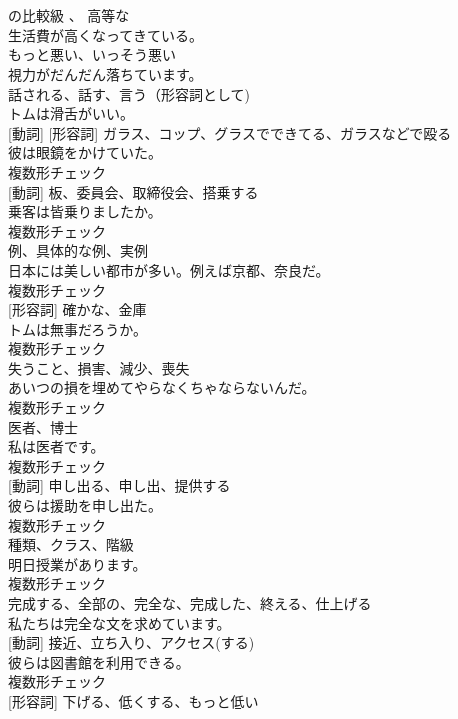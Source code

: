 \documentclass[8pt]{extreport}
\begin{document}
\begin{CJK}{UTF8}{min}
\\	[形容詞]	
\\	の比較級 、 高等な	
\\	生活費が高くなってきている。	
\\	[形容詞]	もっと悪い、いっそう悪い	
\\	視力がだんだん落ちています。	
\\	[形容詞]	話される、話す、言う（形容詞として)	
\\	トムは滑舌がいい。	
\\	[名詞] [動詞] [形容詞]	ガラス、コップ、グラスでできてる、ガラスなどで殴る	
\\	彼は眼鏡をかけていた。	
\\	複数形チェック
\\	[名詞] [動詞]	板、委員会、取締役会、搭乗する	
\\	乗客は皆乗りましたか。	
\\	複数形チェック
\\	[名詞]	例、具体的な例、実例	
\\	日本には美しい都市が多い。例えば京都、奈良だ。	
\\	複数形チェック
\\	[名詞] [形容詞]	確かな、金庫	
\\	トムは無事だろうか。	
\\	複数形チェック
\\	[名詞]	失うこと、損害、減少、喪失	
\\	あいつの損を埋めてやらなくちゃならないんだ。	
\\	複数形チェック
\\	[名詞]	医者、博士	
\\	私は医者です。	
\\	複数形チェック
\\	[名詞] [動詞]	申し出る、申し出、提供する	
\\	彼らは援助を申し出た。	
\\	複数形チェック
\\	[名詞]	種類、クラス、階級	
\\	明日授業があります。	
\\	複数形チェック
\\	[動詞]	完成する、全部の、完全な、完成した、終える、仕上げる	
\\	私たちは完全な文を求めています。	
\\	[名詞] [動詞]	接近、立ち入り、アクセス(する)	
\\	彼らは図書館を利用できる。	
\\	複数形チェック
\\	[動詞] [形容詞]	下げる、低くする、もっと低い	

\end{CJK}
\end{document}
